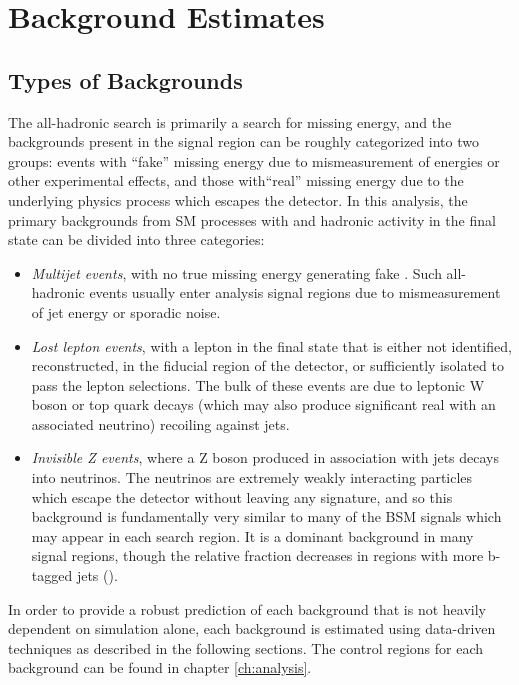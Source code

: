 \chapter{Background Estimates}
\label{ch:bkgs}

\section{Types of Backgrounds}
\label{sec:bkgs}
The \mttwo all-hadronic search is primarily a search for missing energy, and the backgrounds present in the signal region can be roughly categorized into two groups: events with ``fake'' missing energy due to mismeasurement of energies or other experimental effects, and those with``real'' missing energy due to the underlying physics process which escapes the detector. In this analysis, the primary backgrounds from SM processes with \MET and hadronic activity in the final state can be divided into three categories:
\begin{itemize}
	\item {\it Multijet events}, with no true missing energy generating fake \MET. Such all-hadronic events usually enter analysis signal regions due to mismeasurement of jet energy or sporadic noise.
	\item {\it Lost lepton events}, with a lepton in the final state that is either not identified, reconstructed, in the fiducial region of the detector, or sufficiently isolated to pass the lepton selections. The bulk of these events are due to leptonic W boson or top quark decays (which may also produce significant real \MET with an associated neutrino) recoiling against jets.
	\item {\it Invisible Z events}, where a Z boson produced in association with jets decays into neutrinos. The neutrinos are extremely weakly interacting particles which escape the detector without leaving any signature, and so this background is fundamentally very similar to many of the BSM signals which may appear in each search region. It is a dominant background in many signal regions, though the relative fraction decreases in regions with more b-tagged jets (\nb).
\end{itemize}

In order to provide a robust prediction of each background that is not heavily dependent on simulation alone, each background is estimated using data-driven techniques as described in the following sections. The control regions for each background can be found in chapter \ref{ch:analysis}.


